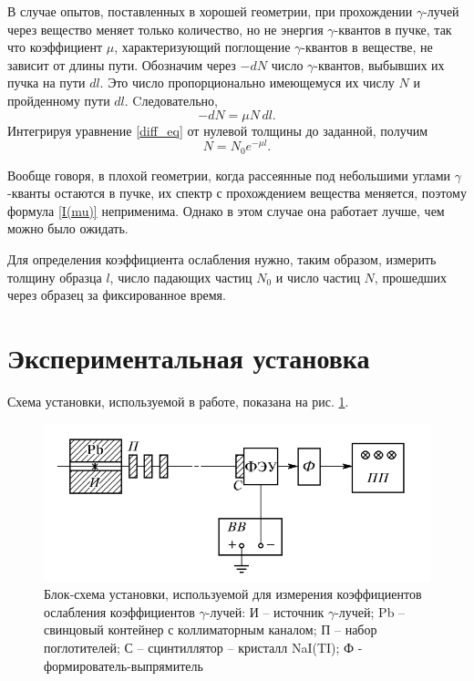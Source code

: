    В случае опытов, поставленных в хорошей геометрии, при прохождении $\gamma$-лучей через вещество меняет только количество, 
    но не энергия $\gamma$-квантов в пучке, так что коэффициент $\mu$, характеризующий поглощение $\gamma$-квантов в веществе, 
    не зависит от длины пути. Обозначим через $-dN$ число $\gamma$-квантов, выбывших их пучка на пути $dl$. 
    Это число пропорционально имеющемуся их числу $N$ и пройденному пути $dl$. Cледовательно,
    \begin{equation}
        \label{diff_eq}
        -dN = \mu N \, dl.
    \end{equation}
    Интегрируя уравнение \eqref{diff_eq} от нулевой толщины до заданной, получим
    \begin{equation}
        \label{eq3}
        N = N_0 e^{-\mu l}.
    \end{equation}

    Вообще говоря, в плохой геометрии, когда рассеянные под небольшими углами $\gamma$-кванты остаются в пучке, их спектр с прохождением вещества меняется, поэтому формула \eqref{I(mu)} неприменима. Однако в этом случае она работает лучше, чем можно было ожидать.

    Для определения коэффициента ослабления нужно, таким образом, измерить толщину образца $l$, число падающих частиц $N_0$ и число частиц $N$, прошедших через образец за фиксированное время.

\section{Экспериментальная установка}

    Схема установки, используемой в работе, показана на рис. \ref{setup1}.

    \begin{figure}[h!]
        \centering
        \includegraphics[width = 12 cm]{images/setup_1}
        \caption{Блок-схема установки, используемой для измерения коэффициентов ослабления коэффициентов $\gamma$-лучей: И -- источник $\gamma$-лучей; 
            Pb -- свинцовый контейнер с коллиматорным каналом; П -- набор поглотителей; С -- сцинтиллятор -- кристалл NaI(TI); Ф - формирователь-выпрямитель}
        \label{setup1}
    \end{figure}

